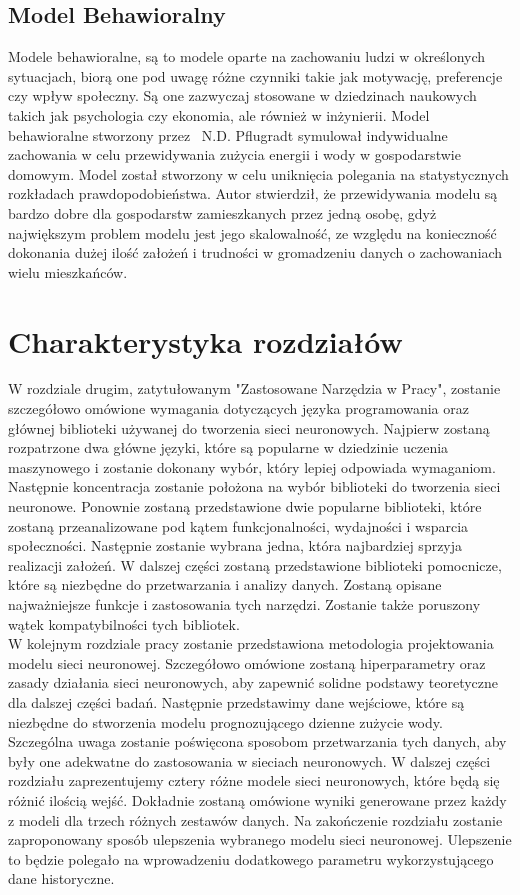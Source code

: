 \documentclass[a4paper,twoside,12pt]{book}
\begin{document}
\subsection{Model Behawioralny}
Modele behawioralne, są to modele oparte na zachowaniu ludzi w określonych sytuacjach, biorą one pod uwagę różne czynniki takie jak motywację, preferencje czy wpływ społeczny. Są one zazwyczaj stosowane w dziedzinach naukowych takich jak psychologia czy ekonomia, ale również w inżynierii. Model behawioralne stworzony przez  N.D. Pflugradt\cite{bib:Behavioural} symulował indywidualne zachowania w celu przewidywania zużycia energii i wody w gospodarstwie domowym. Model został stworzony w celu uniknięcia polegania na statystycznych rozkładach prawdopodobieństwa. Autor stwierdził, że przewidywania modelu są bardzo dobre dla gospodarstw zamieszkanych przez jedną osobę, gdyż największym problem modelu jest jego skalowalność, ze względu na konieczność dokonania dużej ilość założeń i trudności w gromadzeniu danych o zachowaniach wielu mieszkańców.\\


\newpage
\section{Charakterystyka rozdziałów}
W rozdziale drugim, zatytułowanym "Zastosowane Narzędzia w Pracy", zostanie szczegółowo omówione wymagania dotyczących języka programowania oraz głównej biblioteki używanej do tworzenia sieci neuronowych. Najpierw zostaną rozpatrzone dwa główne języki, które są popularne w dziedzinie uczenia maszynowego i zostanie dokonany wybór, który lepiej odpowiada wymaganiom. Następnie koncentracja zostanie położona na wybór biblioteki do tworzenia sieci neuronowe. Ponownie zostaną przedstawione dwie popularne biblioteki, które zostaną przeanalizowane pod kątem funkcjonalności, wydajności i wsparcia społeczności. Następnie zostanie wybrana jedna, która najbardziej sprzyja realizacji założeń. W dalszej części zostaną przedstawione biblioteki pomocnicze, które są niezbędne do przetwarzania i analizy danych. Zostaną opisane najważniejsze funkcje i zastosowania tych narzędzi. Zostanie także poruszony wątek kompatybilności tych bibliotek.\\

W kolejnym rozdziale pracy zostanie przedstawiona metodologia projektowania modelu sieci neuronowej. Szczegółowo omówione zostaną hiperparametry oraz zasady działania sieci neuronowych, aby zapewnić solidne podstawy teoretyczne dla dalszej części badań. Następnie przedstawimy dane wejściowe, które są niezbędne do stworzenia modelu prognozującego dzienne zużycie wody. Szczególna uwaga zostanie poświęcona sposobom przetwarzania tych danych, aby były one adekwatne do zastosowania w sieciach neuronowych. W dalszej części rozdziału zaprezentujemy cztery różne modele sieci neuronowych, które będą się różnić ilością wejść. Dokładnie zostaną omówione wyniki generowane przez każdy z modeli dla trzech różnych zestawów danych. Na zakończenie rozdziału zostanie zaproponowany sposób ulepszenia wybranego modelu sieci neuronowej. Ulepszenie to będzie polegało na wprowadzeniu dodatkowego parametru wykorzystującego dane historyczne.\\
\end{document}

